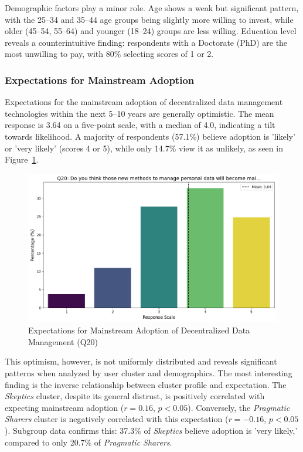 	Demographic factors play a minor role. Age shows a weak but significant pattern, with the 25--34 and 35--44 age groups being slightly more willing to invest, while older (45--54, 55--64) and younger (18--24) groups are less willing. Education level reveals a counterintuitive finding: respondents with a Doctorate (PhD) are the most unwilling to pay, with 80\% selecting scores of 1 or 2.		
	\subsubsection{Expectations for Mainstream Adoption}
		Expectations for the mainstream adoption of decentralized data management technologies within the next 5–10 years are generally optimistic. The mean response is 3.64 on a five-point scale, with a median of 4.0, indicating a tilt towards likelihood. A majority of respondents (57.1\%) believe adoption is 'likely' or 'very likely' (scores 4 or 5), while only 14.7\% view it as unlikely, as seen in Figure~\ref{fig:mainstream_adoption_expectation}. 
		\begin{figure}[ht]\centering
			\includegraphics[width=1\linewidth]{figures/questions/Q20_likert.png}
			\caption{Expectations for Mainstream Adoption of Decentralized Data Management (Q20)}
			\label{fig:mainstream_adoption_expectation}
		\end{figure}
		This optimism, however, is not uniformly distributed and reveals significant patterns when analyzed by user cluster and demographics. The most interesting finding is the inverse relationship between cluster profile and expectation. The \textit{Skeptics} cluster, despite its general distrust, is positively correlated with expecting mainstream adoption ($r = 0.16$, $p < 0.05$). Conversely, the \textit{Pragmatic Sharers} cluster is negatively correlated with this expectation ($r = -0.16$, $p < 0.05$). Subgroup data confirms this: 37.3\% of \textit{Skeptics} believe adoption is 'very likely,' compared to only 20.7\% of \textit{Pragmatic Sharers}.
